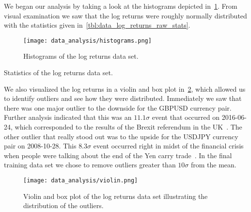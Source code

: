 We began our analysis by taking a look at the histograms depicted in~\cref{fig:histograms_raw}.
From visual examination we saw that the log returns were roughly normally distributed with the statistics given in~\cref{tbl:data_log_returns_raw_stats}.
\begin{figure}[!htb]
    \begin{center}
        \texttt{[image: data\_analysis/histograms.png]}
    \end{center}
    \caption{Histograms of the log returns data set.}
    \label{fig:histograms_raw}
\end{figure}

\begin{table}[!htb]
    \centering
    \begin{adjustbox}{max width=\textwidth}
        
    \end{adjustbox}
    \caption{Statistics of the log returns data set.}
    \label{tbl:data_log_returns_raw_stats}
\end{table}

We also visualized the log returns in a violin and box plot in~\cref{fig:violin_raw}, which allowed us to identify outliers and see how they were distributed.
Immediately we saw that there was one major outlier to the downside for the GBPUSD currency pair.
Further analysis indicated that this was an \( 11.1\sigma \) event that occurred on 2016-06-24, which corresponded to the results of the Brexit referendum in the UK~\cite{brexit_gov_uk}.
The other outlier that really stood out was to the upside for the USDJPY currency pair on 2008-10-28.
This \( 8.3\sigma \) event occurred right in midst of the financial crisis when people were talking about the end of the Yen carry trade~\cite{jpy_carry_trade_nyt}.
In the final training data set we chose to remove outliers greater than \( 10\sigma \) from the mean.
\begin{figure}[!htb]
    \begin{center}
        \texttt{[image: data\_analysis/violin.png]}
    \end{center}
    \caption{Violin and box plot of the log returns data set illustrating the distribution of the outliers.}
    \label{fig:violin_raw}
\end{figure}

